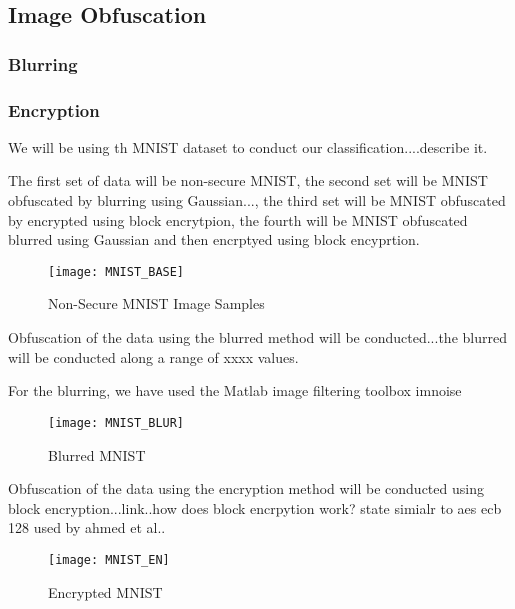 \documentclass[12pt, titlepage]{article}
\begin{document}
\subsection{Image Obfuscation}
\subsubsection{Blurring}\label{BlurringMethodology}
\subsubsection{Encryption}\label{EncryptionMethodology}
We will be using th MNIST dataset to conduct our classification....describe it.

The first set of data will be non-secure MNIST, the second set will be MNIST obfuscated by blurring using Gaussian..., the third set will be MNIST obfuscated by encrypted using block encrytpion, the fourth will be MNIST obfuscated blurred using Gaussian and then encrptyed using block encyprtion. 

\begin{figure}[h!]
	\begin{center}
		\texttt{[image: MNIST\_BASE]}
		\caption{Non-Secure MNIST Image Samples}
		\label{MNIST_BASE}
	\end{center}
\end{figure}


Obfuscation of the data using the blurred method will be conducted...the blurred will be conducted along a range of xxxx values.  

 For the blurring, we have used the Matlab image filtering toolbox imnoise
 
 
 \begin{figure}[h!]
 	\begin{center}
 		\texttt{[image: MNIST\_BLUR]}
 		\caption{Blurred MNIST}
 		\label{MNIST_BLURRED}
 	\end{center}
 \end{figure}

 
 Obfuscation of the data using the encryption method will be conducted using block encryption...link..how does block encrpytion work? state simialr to aes ecb 128 used by ahmed et al..
 
\begin{figure}[h!]
	\begin{center}
		\texttt{[image: MNIST\_EN]}
		\caption{Encrypted MNIST}
		\label{MNIST_ENCRYPTED}
	\end{center}
\end{figure}
\end{document}
